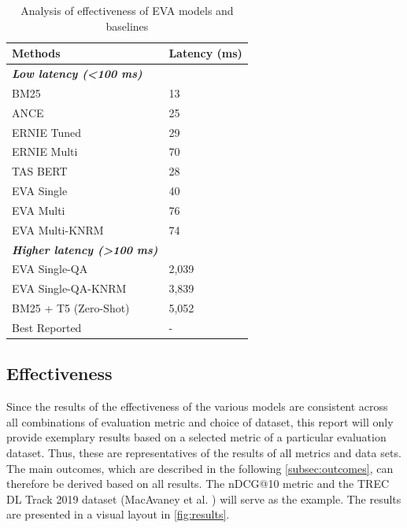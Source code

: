 \def\arraystretch{1.2}
\begin{table}[!htb]
    \small
    \centering
    \begin{tabular}{l|l}
    \textbf{Methods}                                        & \textbf{Latency (ms)} \\ \hline
    \textit{\textbf{Low latency (\textless{}100 ms)}}       & \textit{\textbf{}}    \\ \hline
    BM25                                                    & 13                    \\
    ANCE                                                    & 25                    \\
    ERNIE Tuned                                             & 29                    \\
    ERNIE Multi                                             & 70                    \\
    TAS BERT                                                & 28                    \\
    EVA Single                                              & 40                    \\
    EVA Multi                                               & 76                    \\
    EVA Multi-KNRM                                          & 74                    \\ \hline
    \textit{\textbf{Higher latency (\textgreater{}100 ms)}} & \textit{\textbf{}}    \\ \hline
    EVA Single-QA                                           & 2,039                  \\
    EVA Single-QA-KNRM                                      & 3,839                  \\
    BM25 + T5 (Zero-Shot)                                   & 5,052                  \\ \hline
    Best Reported                                           & -                    
    \end{tabular}
    \caption{Analysis of effectiveness of EVA models and baselines}
    \label{tab:results_effectiveness}
\end{table}

\subsection{Effectiveness}\label{sec:effectiveness}

Since the results of the effectiveness of the various models are consistent across all combinations of evaluation metric and choice of dataset, this report will only provide exemplary results based on a selected metric of a particular evaluation dataset. Thus, these are representatives of the results of all metrics and data sets. The main outcomes, which are described in the following \autoref{subsec:outcomes}, can therefore be derived based on all results. The nDCG@10 metric and the TREC DL Track 2019 dataset (MacAvaney et al. \cite{trec_dl_2019}) will serve as the example. The results are presented in a visual layout in \autoref{fig:results}.

